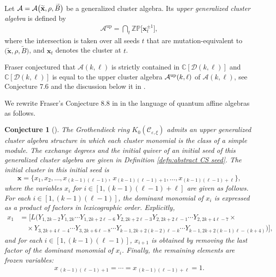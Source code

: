 \documentclass[11pt, reqno]{amsart}
\theoremstyle{plain}
\newtheorem{conjecture}[theorem]{Conjecture}
\theoremstyle{definition}
\numberwithin{equation}{section}
\begin{document}
Let $\mathcal{A}= \smash{\mathcal{A}\big(\widetilde{\mathbf{x}}, \rho, \widetilde{B}\big)}$ be a generalized cluster algebra. Its \emph{upper generalized cluster algebra} \cite{GSV18} is defined by
\begin{align}\label{Eq: the definition of upper generalized cluster algebra}
\mathcal{A}^{\mathrm{up}} =\bigcap_{t} \mathbb{Z}\mathbb{P}\big[\mathbf{x}_t^{\pm1}\big],
\end{align}
where the intersection is taken over all seeds $t$ that are mutation-equivalent to 
$\big(\widetilde{\mathbf{x}}, \rho, \widetilde{B}\big)$, and $\mathbf{x}_t$ denotes the cluster at $t$.

Fraser conjectured that $\mathcal{A}(k,\ell)$ is strictly contained in $\mathbb{C}[\mathcal{D}(k, \ell)]$ and $\mathbb{C}[\mathcal{D}(k, \ell)]$ is equal to the upper cluster algebra $\mathcal{A}^{\rm up}(k,\ell)$ of $\mathcal{A}(k,\ell)$, see Conjecture 7.6 and the discussion below it in \cite{Fra20}.

We rewrite Fraser's Conjecture 8.8 in \cite{Fra20} in the language of quantum affine algebras as follows. 
\begin{conjecture}[{\cite[Conjecture 8.8]{Fra20}}]\label{Conj: rewrite Fraser's conjecture}
The Grothendieck ring $K_0(\mathcal{C}_{\varepsilon, \xi})$ admits an upper generalized cluster algebra structure in which each cluster monomial is the class of a simple module. The exchange degrees and the initial quiver of an initial seed of this generalized cluster algebra are  given in Definition \ref{defn:abstract CS seed}. The initial cluster in this initial seed is
\[
\mathbf{x}=\{x_1,x_2,\ldots,x_{(k-1)(\ell-1)},\,x_{(k-1)(\ell-1)+1},\ldots,x_{(k-1)(\ell-1)+\ell}\},
\]
where the variables $x_i$ for $i \in [1,(k-1)(\ell-1)+\ell]$ are given as follows. For each $i \in [1,(k-1)(\ell-1)]$, the dominant monomial of $x_i$ is expressed as a product of factors in lexicographic order. Explicitly, 
\begin{align*}
x_1 &=[ L(Y_{1,2k-2} Y_{1,2k} \cdots Y_{1,2k+2\ell-6} \, 
Y_{2,2k+2\ell-3} Y_{2,2k+2\ell-1} \cdots Y_{2,2k+4\ell-7}\times \\
&\quad \times Y_{3,2k+4\ell-4} \cdots Y_{3,2k+6\ell-8} \cdots 
Y_{k-1,2k+2(k-2)\ell-k} \cdots Y_{k-1,2k+2(k-1)\ell-(k+4)})],
\end{align*}
and for each $i \in [1,(k-1)(\ell-1)]$, $x_{i+1}$ is obtained by removing the last factor of the dominant monomial of $x_i$.  
Finally, the remaining elements are frozen variables:
\[
x_{\,(k-1)(\ell-1)+1} = \cdots = x_{\,(k-1)(\ell-1)+\ell} = 1.
\]
\end{conjecture}
\end{document}
